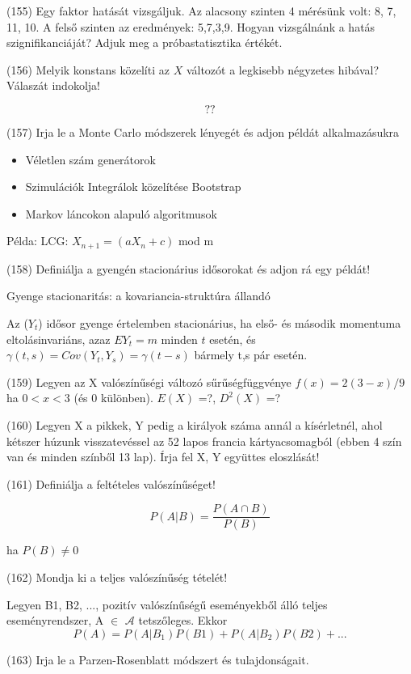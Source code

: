 \documentclass[12p]{article}
\begin{document}
(155) Egy faktor hatását vizsgáljuk. Az alacsony szinten 4 mérésünk volt: 8, 7, 11, 10. A felső
szinten az eredmények: 5,7,3,9. Hogyan vizsgálnánk a hatás szignifikanciáját? Adjuk meg
a próbastatisztika értékét.

(156) Melyik konstans közelíti az $X$ változót a legkisebb négyzetes hibával? Válaszát indokolja!

$$??$$

(157)  Irja le a Monte Carlo módszerek lényegét és adjon példát alkalmazásukra

\begin{itemize}
	\item Véletlen szám generátorok
	\item Szimulációk
	\subitem Integrálok közelítése
	\subitem Bootstrap
	\item Markov láncokon alapuló algoritmusok
\end{itemize}

Példa: LCG: $X_{n+1} = (aX_n + c)$ mod m

(158) Definiálja a gyengén stacionárius idősorokat és adjon rá egy példát!

Gyenge stacionaritás: a kovariancia-struktúra állandó

Az ($Y_t$) idősor gyenge értelemben stacionárius, ha első- és második momentuma eltolásinvariáns, azaz $EY_t = m$ minden $t$ esetén, és $\gamma(t,s) = Cov(Y_t, Y_s) = \gamma(t - s)$ bármely t,s pár esetén.

(159) Legyen az X valószínűségi változó sűrűségfüggvénye $f(x) = 2(3 - x)/9$ ha $0 < x < 3$ (és 0 különben). $E(X)$ =?, $D^2(X)$ =? 

(160) Legyen X a pikkek, Y pedig a királyok száma annál a kísérletnél, ahol kétszer húzunk
visszatevéssel az 52 lapos francia kártyacsomagból (ebben 4 szín van és minden színből 13
lap). Írja fel X, Y együttes eloszlását!

(161) Definiálja a feltételes valószínűséget!

$$P(A|B) = \frac{P(A \cap B)}{P(B)}$$

ha $P(B) \neq 0$

(162) Mondja ki a teljes valószínűség tételét!

Legyen B1, B2, ..., pozitív valószínűségű eseményekből álló teljes eseményrendszer, A $\in$ $\mathscr{A}$ tetszőleges. Ekkor
$$P(A) = P(A|B_1)P(B1)+P(A|B_2)P(B2)+ ...$$


(163) Irja le a Parzen-Rosenblatt módszert és tulajdonságait.
\end{document}
